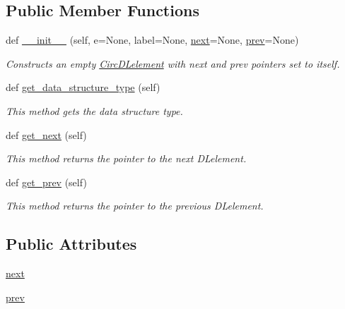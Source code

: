 \subsection*{Public Member Functions}
\begin{DoxyCompactItemize}
\item 
def \mbox{\hyperlink{class_bridges_1_1circ__dl__element_1_1_circ_d_lelement_a60b9eb3519f97da893e36a35b7e4f0ff}{\+\_\+\+\_\+init\+\_\+\+\_\+}} (self, e=None, label=None, \mbox{\hyperlink{class_bridges_1_1circ__dl__element_1_1_circ_d_lelement_ab22d3f07990637d468acfb7dd47bf905}{next}}=None, \mbox{\hyperlink{class_bridges_1_1circ__dl__element_1_1_circ_d_lelement_ac52bcf8fb0ce64dfcda81007643510ab}{prev}}=None)
\begin{DoxyCompactList}\small\item\em Constructs an empty \mbox{\hyperlink{class_bridges_1_1circ__dl__element_1_1_circ_d_lelement}{Circ\+D\+Lelement}} with next and prev pointers set to itself. \end{DoxyCompactList}\item 
def \mbox{\hyperlink{class_bridges_1_1circ__dl__element_1_1_circ_d_lelement_a47f182e2b4548acc63021b019ec09dd3}{get\+\_\+data\+\_\+structure\+\_\+type}} (self)
\begin{DoxyCompactList}\small\item\em This method gets the data structure type. \end{DoxyCompactList}\item 
def \mbox{\hyperlink{class_bridges_1_1circ__dl__element_1_1_circ_d_lelement_a5d52715940d44ce54de49948f55d5991}{get\+\_\+next}} (self)
\begin{DoxyCompactList}\small\item\em This method returns the pointer to the next D\+Lelement. \end{DoxyCompactList}\item 
def \mbox{\hyperlink{class_bridges_1_1circ__dl__element_1_1_circ_d_lelement_a1acacbb379727183540f705a48e95500}{get\+\_\+prev}} (self)
\begin{DoxyCompactList}\small\item\em This method returns the pointer to the previous D\+Lelement. \end{DoxyCompactList}\end{DoxyCompactItemize}
\subsection*{Public Attributes}
\begin{DoxyCompactItemize}
\item 
\mbox{\hyperlink{class_bridges_1_1circ__dl__element_1_1_circ_d_lelement_ab22d3f07990637d468acfb7dd47bf905}{next}}
\item 
\mbox{\hyperlink{class_bridges_1_1circ__dl__element_1_1_circ_d_lelement_ac52bcf8fb0ce64dfcda81007643510ab}{prev}}
\end{DoxyCompactItemize}


